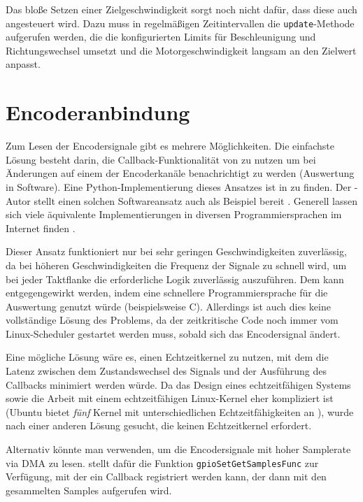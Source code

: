 \documentclass[german]{thesis_KBS}
\newcommand{\code}[1]{\texttt{#1}}  %
\begin{document}
Das bloße Setzen einer Zielgeschwindigkeit sorgt noch nicht dafür, dass diese
auch angesteuert wird. Dazu muss in regelmäßigen Zeitintervallen die
\code{update}-Methode aufgerufen werden, die die konfigurierten Limits für
Beschleunigung und Richtungswechsel umsetzt und die Motorgeschwindigkeit langsam
an den Zielwert anpasst.


\section{Encoderanbindung}

Zum Lesen der Encodersignale gibt es mehrere Möglichkeiten. Die einfachste
Lösung besteht darin, die Callback-Funktionalität von \pigpio{} zu nutzen um bei
Änderungen auf einem der Encoderkanäle benachrichtigt zu werden (Auswertung in
Software). Eine Python-Implementierung dieses Ansatzes ist in
 zu finden. Der \pigpio{}-Autor stellt einen solchen
Softwareansatz auch als Beispiel bereit \cite{encoder-software-pigpio}. Generell
lassen sich viele äquivalente Implementierungen in diversen Programmiersprachen
im Internet finden \cite{encoder-software-modmypi}
\cite{encoder-software-arduino}.

Dieser Ansatz funktioniert nur bei sehr geringen Geschwindigkeiten zuverlässig,
da bei höheren Geschwindigkeiten die Frequenz der Signale zu schnell wird, um
bei jeder Taktflanke die erforderliche Logik zuverlässig auszuführen. Dem kann
entgegengewirkt werden, indem eine schnellere Programmiersprache für die
Auswertung genutzt würde (beispielsweise C). Allerdings ist auch dies keine
vollständige Lösung des Problems, da der zeitkritische Code noch immer vom
Linux-Scheduler gestartet werden muss, sobald sich das Encodersignal ändert.

Eine mögliche Lösung wäre es, einen Echtzeitkernel zu nutzen, mit dem die Latenz
zwischen dem Zustandswechsel des Signals und der Ausführung des Callbacks
minimiert werden würde. Da das Design eines echtzeitfähigen Systems sowie die
Arbeit mit einem echtzeitfähigen Linux-Kernel eher kompliziert ist (Ubuntu
bietet \emph{fünf} Kernel mit unterschiedlichen Echtzeitfähigkeiten an
\cite{ubuntu-realtime}), wurde nach einer anderen Lösung gesucht, die keinen
Echtzeitkernel erfordert.

Alternativ könnte man \pigpio{} verwenden, um die Encodersignale mit hoher
Samplerate via DMA zu lesen. \pigpio{} stellt dafür die Funktion
\code{gpioSetGetSamplesFunc} zur Verfügung, mit der ein Callback registriert
werden kann, der dann mit den gesammelten Samples aufgerufen wird.
\end{document}
